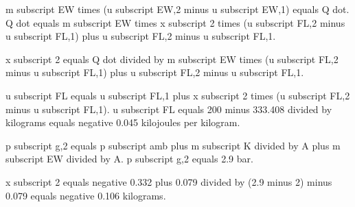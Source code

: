 m subscript EW times (u subscript EW,2 minus u subscript EW,1) equals Q dot.  
Q dot equals m subscript EW times x subscript 2 times (u subscript FL,2 minus u subscript FL,1) plus u subscript FL,2 minus u subscript FL,1.  

x subscript 2 equals Q dot divided by m subscript EW times (u subscript FL,2 minus u subscript FL,1) plus u subscript FL,2 minus u subscript FL,1.  

u subscript FL equals u subscript FL,1 plus x subscript 2 times (u subscript FL,2 minus u subscript FL,1).  
u subscript FL equals 200 minus 333.408 divided by kilograms equals negative 0.045 kilojoules per kilogram.  

p subscript g,2 equals p subscript amb plus m subscript K divided by A plus m subscript EW divided by A.  
p subscript g,2 equals 2.9 bar.  

x subscript 2 equals negative 0.332 plus 0.079 divided by (2.9 minus 2) minus 0.079 equals negative 0.106 kilograms.